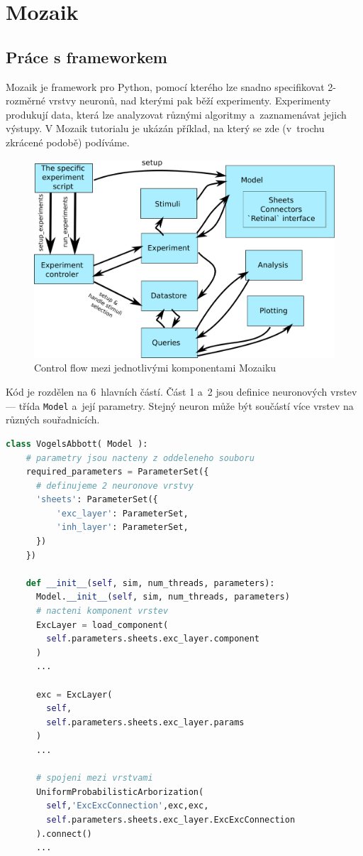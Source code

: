 \chapter{Mozaik}
\label{chap:mozaik}
\section{Práce s frameworkem}

Mozaik je framework pro Python, pomocí kterého lze snadno specifikovat 2-rozměrné vrstvy neuronů, nad kterými pak běží experimenty. Experimenty produkují data, která lze analyzovat různými algoritmy a~zaznamenávat jejich výstupy. V Mozaik tutorialu\cite{MozaikTutorial} je ukázán příklad, na který se zde (v~trochu zkrácené podobě) podíváme.

\begin{figure}[h]
  \centering
  \includegraphics[width=.6\linewidth]{img/mozaik_control_flow.png}
  \caption{Control flow mezi jednotlivými komponentami Mozaiku\cite{MozaikIntroduction}}
\end{figure}

Kód je rozdělen na 6~hlavních částí. Část 1 a~2 jsou definice neuronových vrstev --- třída \lstinline|Model| a~její parametry. Stejný neuron může být součástí více vrstev na různých souřadnicích.

\begin{lstlisting}[language=Python]
  class VogelsAbbott( Model ):
    # parametry jsou nacteny z oddeleneho souboru
    required_parameters = ParameterSet({
      # definujeme 2 neuronove vrstvy
      'sheets': ParameterSet({
          'exc_layer': ParameterSet,
          'inh_layer': ParameterSet, 
      })
    })

    def __init__(self, sim, num_threads, parameters):
      Model.__init__(self, sim, num_threads, parameters)
      # nacteni komponent vrstev
      ExcLayer = load_component(
        self.parameters.sheets.exc_layer.component
      )
      ...
      
      exc = ExcLayer(
        self, 
        self.parameters.sheets.exc_layer.params
      )
      ...

      # spojeni mezi vrstvami
      UniformProbabilisticArborization(
        self,'ExcExcConnection',exc,exc,
        self.parameters.sheets.exc_layer.ExcExcConnection
      ).connect()
      ...
\end{lstlisting}

